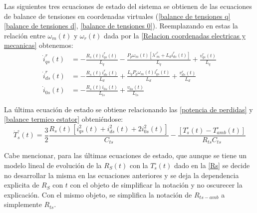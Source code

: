 \documentclass[a4paper, 10pt, onecolumn,journal]{ieeeconf}
\begin{document}
Las siguientes tres ecuaciones de estado del sistema se obtienen de las ecuaciones de balance de tensiones
en coordenadas virtuales (\cref{balance de tensiones q} \cref{balance de tensiones d}, \cref{balance de tensiones 0}).
Reemplazando en estas la relación entre $\omega_m(t)$ y $\omega_r(t)$ dada por la \cref{Relacion coordenadas electricas y mecanicas} obtenemos:
\begin{align}
    \dot{i}^r_{qs}(t) &= -\frac{R_s(t) i^r_{qs}(t)}{L_q} - \frac{P_p \omega_m(t) \left[\lambda'^r_m + L_d i^r_{ds}(t)\right]}{L_q} + \frac{v^r_{qs}(t)}{L_q} \label{ecuacion de estado iqs}\\
    \dot{i}^r_{ds}(t) &= -\frac{R_s(t) i^r_{ds}(t)}{L_d} + \frac{L_q P_p \omega_m(t)i^r_{qs}(t)}{L_d}  + \frac{v^r_{ds}(t)}{L_d} \label{ecuacion de estado ids}\\ 
    \dot{i}_{0s}(t)   &= -\frac{R_s(t) i_{0s}(t)}{L_{ls}} + \frac{v_{0s}(t)}{L_{ls}}\label{ecuacion de estado i0s}
\end{align}

La última ecuación de estado se obtiene relacionando las \cref{potencia de perdidas} y \cref{balance termico estator} obteniéndose:
\begin{equation}
    \dot{T}^\circ_s(t) = \frac{3}{2} \frac{R_s(t) \left[ i_{qs}^2(t) + i_{ds}^2(t) + 2 i_{0s}^2(t) \right]}{C_{ts}} - \frac{\left[T_s^{\circ}(t) - T_{amb}^{\circ}(t)\right]}{R_{ts}C_{ts}} 
    \label{ecuacion de estado Ts}
\end{equation}

Cabe mencionar, para las últimas ecuaciones de estado, que aunque se tiene un modelo lineal de evolución de la $R_S(t)$ con la $T^\circ_s(t)$ dado en la \cref{Rs}
se decide no desarrollar la misma en las ecuaciones anteriores y se deja la dependencia explicita de $R_S$ con $t$ con el objeto de simplificar la notación
y no oscurecer la explicación. Con el mismo objeto, se simplifica la notación de $R_{ts-amb}$ a simplemente $R_{ts}$.
\end{document}
